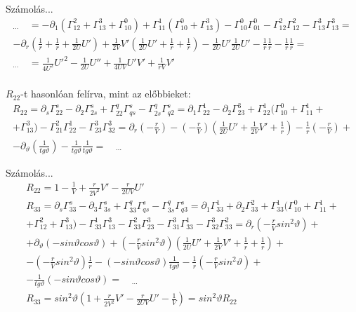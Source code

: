 \documentclass[10pt]{beamer}
\begin{document}
\begin{frame}[t]{Számolás...}
\begin{gather*}
_{\cdots} \quad = -\partial_{1}(\Gamma_{12}^{2} + \Gamma_{13}^{3} + \Gamma_{10}^{0}) + \Gamma_{11}^{1}(\Gamma_{10}^{0} + \Gamma_{13}^{3})
- \Gamma_{10}^{0}\Gamma_{01}^{0} - \Gamma_{12}^{2}\Gamma_{12}^{2} - \Gamma_{13}^{3}\Gamma_{13}^{3} = \\
-\partial_{r}(\frac{1}{r} + \frac{1}{r} + \frac{1}{2U}U') + \frac{1}{2V}V'(\frac{1}{2U}U' + \frac{1}{r} + \frac{1}{r}) - \frac{1}{2U}U'\frac{1}{2U}U'
- \frac{1}{r}\frac{1}{r} - \frac{1}{r}\frac{1}{r} = \\
_{\cdots} \quad = \frac{1}{4U^{2}}U'^{2} - \frac{1}{2U}U'' + \frac{1}{4UV}U'V' + \frac{1}{rV}V' \\
\end{gather*}
\par $R_{22}$-t hasonlóan felírva, mint az előbbieket:
\begin{gather*}
R_{22} = \partial_{s}\Gamma_{22}^{s} - \partial_{2}\Gamma_{2s}^{s} + \Gamma_{22}^{q}\Gamma_{qs}^{s} - \Gamma_{2s}^{q}\Gamma_{q2}^{s} =
\partial_{1}\Gamma_{22}^{1} - \partial_{2}\Gamma_{23}^{3} + \Gamma_{22}^{1}(\Gamma_{10}^{0} + \Gamma_{11}^{1} + \\
+ \Gamma_{13}^{3}) - \Gamma_{21}^{2}\Gamma_{22}^{1} - \Gamma_{23}^{3}\Gamma_{32}^{3} = \partial_{r}(-\frac{r}{V}) 
- (-\frac{r}{V})(\frac{1}{2U}U' + \frac{1}{2V}V' + \frac{1}{r}) - \frac{1}{r}(-\frac{r}{V}) + \\
- \partial_{\vartheta}(\frac{1}{tg\vartheta}) - \frac{1}{tg\vartheta}\frac{1}{tg\vartheta} = \quad _{\cdots}
\end{gather*}
\end{frame}

\begin{frame}[t]{Számolás...}
\begin{gather*}
R_{22} = 1 - \frac{1}{V} + \frac{r}{2V^{2}}V' - \frac{r}{2UV}U' \\
R_{33} = \partial_{s}\Gamma_{33}^{s} - \partial_{3}\Gamma_{3s}^{s} + \Gamma_{33}^{q}\Gamma_{qs}^{s} - \Gamma_{3s}^{q}\Gamma_{q3}^{s} =
\partial_{1}\Gamma_{33}^{1} + \partial_{2}\Gamma_{33}^{2} + \Gamma_{33}^{1}(\Gamma_{10}^{0} + \Gamma_{11}^{1} + \\
+ \Gamma_{12}^{2} + \Gamma_{13}^{3}) - \Gamma_{33}^{1}\Gamma_{13}^{3} - \Gamma_{33}^{2}\Gamma_{23}^{3} - \Gamma_{31}^{3}\Gamma_{33}^{1}
- \Gamma_{32}^{3}\Gamma_{33}^{2} = \partial_{r}(-\frac{r}{V}sin^{2}\vartheta ) + \\
+ \partial_{\vartheta}(-sin\vartheta cos\vartheta ) + (-\frac{r}{V}sin^{2}\vartheta )(\frac{1}{2U}U' + \frac{1}{2V}V' + \frac{1}{r} + \frac{1}{r} ) + \\
- (-\frac{r}{V}sin^{2}\vartheta )\frac{1}{r} - (-sin\vartheta cos\vartheta)\frac{1}{tg\vartheta} - \frac{1}{r}(-\frac{r}{V}sin^{2}\vartheta) + \\
- \frac{1}{tg\vartheta}(-sin\vartheta cos\vartheta ) = \quad _{\cdots} \\
R_{33} = sin^{2}\vartheta (1 + \frac{r}{2V^{2}}V' - \frac{r}{2UV}U' - \frac{1}{V}) = sin^{2}\vartheta R_{22}
\end{gather*}
\end{frame}
\end{document}
